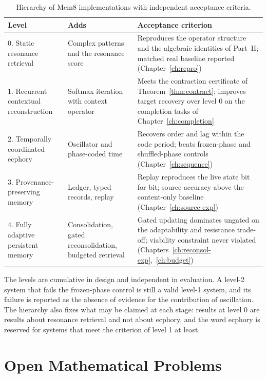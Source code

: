 \begin{table}[t]
\centering
\small
\renewcommand{\arraystretch}{1.25}
\begin{tabularx}{\textwidth}{@{}l>{\raggedright\arraybackslash}p{3.6cm}>{\raggedright\arraybackslash}X@{}}
\toprule
Level & Adds & Acceptance criterion\\
\midrule
0. Static resonance retrieval & Complex patterns and the resonance score & Reproduces the operator structure and the algebraic identities of Part~II; matched real baseline reported (Chapter~\ref{ch:repro})\\
1. Recurrent contextual reconstruction & Softmax iteration with context operator & Meets the contraction certificate of Theorem~\ref{thm:contract}; improves target recovery over level 0 on the completion tasks of Chapter~\ref{ch:completion}\\
2. Temporally coordinated ecphory & Oscillator and phase-coded time & Recovers order and lag within the code period; beats frozen-phase and shuffled-phase controls (Chapter~\ref{ch:sequence})\\
3. Provenance-preserving memory & Ledger, typed records, replay & Replay reproduces the live state bit for bit; source accuracy above the content-only baseline (Chapter~\ref{ch:source-exp})\\
4. Fully adaptive persistent memory & Consolidation, gated reconsolidation, budgeted retrieval & Gated updating dominates ungated on the adaptability and resistance trade-off; viability constraint never violated (Chapters~\ref{ch:reconsol-exp},~\ref{ch:budget})\\
\bottomrule
\end{tabularx}
\caption{Hierarchy of Mem8 implementations with independent acceptance criteria.}\label{tab:levels}
\end{table}

The levels are cumulative in design and independent in evaluation. A level-2 system that fails the frozen-phase control is still a valid level-1 system, and its failure is reported as the absence of evidence for the contribution of oscillation. The hierarchy also fixes what may be claimed at each stage: results at level 0 are results about resonance retrieval and not about ecphory, and the word ecphory is reserved for systems that meet the criterion of level 1 at least.

\chapter{Open Mathematical Problems}\label{ch:open}

